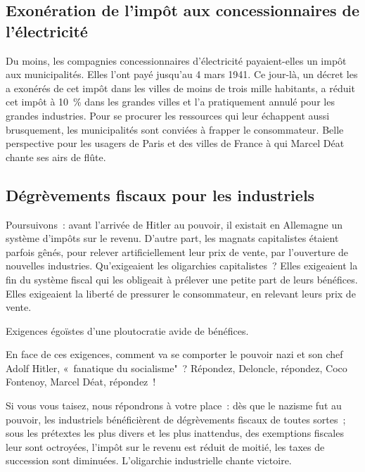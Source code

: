 \documentclass[french,twoside]{book} %
\begin{document}
\subsection[Exonération de l’impôt aux concessionnaires de l’électricité]{Exonération de l’impôt aux concessionnaires de l’électricité}
\noindent Du moins, les compagnies concessionnaires d’électricité payaient-elles un impôt aux municipalités. Elles l’ont payé jusqu’au 4 mars 1941. Ce jour-là, un décret les a exonérés de cet impôt dans les villes de moins de trois mille habitants, a réduit cet impôt à 10 \% dans les grandes villes et l’a pratiquement annulé pour les grandes industries. Pour se procurer les ressources qui leur échappent aussi brusquement, les municipalités sont conviées à frapper le consommateur. Belle perspective pour les usagers de Paris et des villes de France à qui Marcel Déat chante ses airs de flûte.
\subsection[Dégrèvements fiscaux pour les industriels]{Dégrèvements fiscaux pour les industriels}
\noindent Poursuivons : avant l’arrivée de Hitler au pouvoir, il existait en Allemagne un système d’impôts sur le revenu. D’autre part, les magnats capitalistes étaient parfois gênés, pour relever artificiellement leur prix de vente, par l’ouverture de nouvelles industries. Qu’exigeaient les oligarchies capitalistes ? Elles exigeaient la fin du système fiscal qui les obligeait à prélever une petite part de leurs bénéfices. Elles exigeaient la liberté de pressurer le consommateur, en relevant leurs prix de vente.\par
Exigences égoïstes d’une ploutocratie avide de bénéfices.\par
En face de ces exigences, comment va se comporter le pouvoir nazi et son chef Adolf Hitler, « fanatique du socialisme" ? Répondez, Deloncle, répondez, Coco Fontenoy, Marcel Déat, répondez !\par
Si vous vous taisez, nous répondrons à votre place : dès que le nazisme fut au pouvoir, les industriels bénéficièrent de dégrèvements fiscaux de toutes sortes ; sous les prétextes les plus divers et les plus inattendus, des exemptions fiscales leur sont octroyées, l’impôt sur le revenu est réduit de moitié, les taxes de succession sont diminuées. L’oligarchie industrielle chante victoire.
\end{document}
